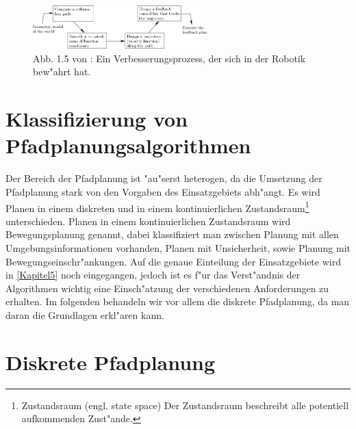 \begin{figure} %
	\centering
	\includegraphics[width=0.6\textwidth]{images/img247.png}
	\caption{Abb. 1.5 von \cite[~S. 20]{Lav06}:  Ein Verbesserungsprozess, der sich in der Robotik bew"ahrt hat.}
	\label{lav02}
\end{figure}

\section{Klassifizierung von Pfadplanungsalgorithmen} %
Der Bereich der Pfadplanung ist "au"serst heterogen, da die Umsetzung der Pfadplanung stark von den Vorgaben des Einsatzgebiets abh"angt. 
Es wird Planen in einem diskreten und in einem kontinuierlichen Zustandsraum\footnote{Zustandsraum (engl. state space) Der Zustandsraum beschreibt alle potentiell aufkommenden Zust"ande.} unterschieden. Planen in einem kontinuierlichen Zustandsraum wird Bewegungsplanung genannt, dabei klassifiziert man zwischen Planung mit allen Umgebungsinformationen vorhanden, Planen mit Unsicherheit, sowie Planung mit Bewegungseinschr"ankungen.
Auf die genaue Einteilung der Einsatzgebiete wird in \ref{Kapitel5} noch eingegangen, jedoch ist es f"ur das Verst"andnis der Algorithmen wichtig eine Einsch"atzung der verschiedenen Anforderungen zu erhalten. Im folgenden behandeln wir vor allem die diskrete Pfadplanung, da man daran die Grundlagen erkl"aren kann. \cite[~S. 24ff]{Lav06} 

\section{Diskrete Pfadplanung} \label{Kapitel 4.3} %

